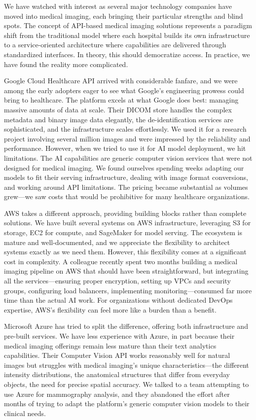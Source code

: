 \documentclass[12pt,a4paper]{article}
\begin{document}
We have watched with interest as several major technology companies have moved into medical imaging, each bringing their particular strengths and blind spots. The concept of API-based medical imaging solutions represents a paradigm shift from the traditional model where each hospital builds its own infrastructure to a service-oriented architecture where capabilities are delivered through standardized interfaces. In theory, this should democratize access. In practice, we have found the reality more complicated.

Google Cloud Healthcare API arrived with considerable fanfare, and we were among the early adopters eager to see what Google's engineering prowess could bring to healthcare. The platform excels at what Google does best: managing massive amounts of data at scale. Their DICOM store handles the complex metadata and binary image data elegantly, the de-identification services are sophisticated, and the infrastructure scales effortlessly. We used it for a research project involving several million images and were impressed by the reliability and performance. However, when we tried to use it for AI model deployment, we hit limitations. The AI capabilities are generic computer vision services that were not designed for medical imaging. We found ourselves spending weeks adapting our models to fit their serving infrastructure, dealing with image format conversions, and working around API limitations. The pricing became substantial as volumes grew—we saw costs that would be prohibitive for many healthcare organizations.

AWS takes a different approach, providing building blocks rather than complete solutions. We have built several systems on AWS infrastructure, leveraging S3 for storage, EC2 for compute, and SageMaker for model serving. The ecosystem is mature and well-documented, and we appreciate the flexibility to architect systems exactly as we need them. However, this flexibility comes at a significant cost in complexity. A colleague recently spent two months building a medical imaging pipeline on AWS that should have been straightforward, but integrating all the services—ensuring proper encryption, setting up VPCs and security groups, configuring load balancers, implementing monitoring—consumed far more time than the actual AI work. For organizations without dedicated DevOps expertise, AWS's flexibility can feel more like a burden than a benefit.

Microsoft Azure has tried to split the difference, offering both infrastructure and pre-built services. We have less experience with Azure, in part because their medical imaging offerings remain less mature than their text analytics capabilities. Their Computer Vision API works reasonably well for natural images but struggles with medical imaging's unique characteristics—the different intensity distributions, the anatomical structures that differ from everyday objects, the need for precise spatial accuracy. We talked to a team attempting to use Azure for mammography analysis, and they abandoned the effort after months of trying to adapt the platform's generic computer vision models to their clinical needs.
\end{document}
